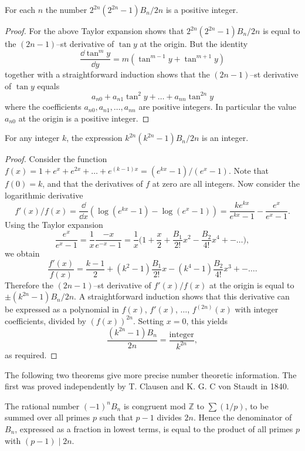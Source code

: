 \documentclass[../main]{subfiles}
\begin{document}
\begin{lemma}
\label{lem:B.1}
For each $n$ the number $2^{2n} (2^{2n} - 1)B_n/2n$ is a positive integer.
\end{lemma}
\begin{proof} 
For the above Taylor expansion shows that $2^{2n}(2^{2n} - 1)B_n/2n$ is equal to the $(2n - 1)$--st derivative of $\tan y$ at the origin. But the identity \[\dfrac{\dd \tan^m y}{\dd y} = m(\tan^{m - 1} y + \tan^{m + 1} y)\] together with a straightforward induction shows that the $(2n - 1)$--st derivative of $\tan y$ equals \[a_{n0} + a_{n1} \tan^2 y + \ldots + a_{nn} \tan^{2n} y\] where the coefficients $a_{n0}, a_{n1}, \ldots, a_{nn}$ are positive integers. In particular the value $a_{n0}$ at the origin is a positive integer. 
\end{proof}

\begin{lemma}
\label{lem:B.2}
For any integer $k$, the expression $k^{2n}(k^{2n} - 1)B_n/2n$ is an integer.
\end{lemma}

\begin{proof}
Consider the function $f(x) = 1 + e^x + e^{2x} + \ldots + e^{(k - 1) x} = (e^{k x} - 1)/(e^x - 1)$. Note that $f(0) = k$, and that the derivatives of $f$ at zero are all integers. Now consider the logarithmic derivative
\[f'(x)/f(x) = \frac \dd {\dd x} (\log(e^{kx} - 1) - \log(e^x - 1)) = \dfrac{k e^{kx}}{e^{kx} - 1} - \dfrac{e^x}{e^x - 1}.\]
Using the Taylor expansion 
\[\frac {e^x} {e^x - 1} = \frac 1 x \frac {-x} {e^{-x} - 1} = \frac 1 x \bigg(1+ \frac x 2 + \frac {B_1} {2!} x^2 - \frac {B_2} {4!} x^4 + - \ldots\bigg),\]
we obtain \[\dfrac{f'(x)}{f(x)} = \dfrac{k - 1}{2} + (k^2 - 1) \frac {B_1} {2!} x - (k^4 - 1) \frac {B_2} {4!} x^3 + - \ldots .\]
Therefore the $(2n - 1)$--st derivative of $f'(x)/f(x)$ at the origin is equal to \newline $\pm (k^{2n} - 1)B_n/2n$. A straightforward induction shows that this derivative can be expressed as a polynomial in $f(x)$, $f'(x)$, $\ldots$, $f^{(2n)}(x)$ with integer coefficients, divided by $(f(x))^{2n}$. Setting $x = 0$, this yields \[\dfrac{(k^{2n} - 1)B_n}{2n} = \dfrac{\mathrm{integer}}{k^{2n}},\] as required.
\end{proof}

The following two theorems give more precise number theoretic information. The first was proved independently by T. Clausen and K. G. C von Staudt in 1840.

\begin{theorem}
\label{thm:B.3}
The rational number $(-1)^n B_n$ is congruent mod $\mathbb Z$ to $\sum (1/p)$, to be summed over all primes $p$ such that $p - 1$ divides $2n$. Hence the denominator of $B_n$, expressed as a fraction in lowest terms, is equal to the product of all primes $p$ with $(p - 1) \mid 2n$. 
\end{theorem}
\end{document}
